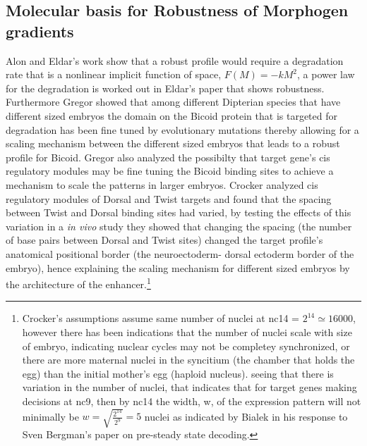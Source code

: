 \subsection{Molecular basis for Robustness of Morphogen gradients}

Alon and Eldar's work show that a robust profile would require a degradation rate that is a nonlinear implicit function of space, $ F(M) = -kM^2$, a power law for the degradation is worked out in Eldar's paper that shows robustness\cite{pmid12239569}.  Furthermore Gregor showed that among different Dipterian species that have different sized embryos the domain on the Bicoid protein that is targeted for degradation has been fine tuned by evolutionary mutations thereby allowing for a scaling mechanism between the different sized embryos that leads to a robust profile for Bicoid.  Gregor also analyzed the possibilty that target gene's cis regulatory modules may be fine tuning the Bicoid binding sites to achieve a mechanism to scale the patterns in larger embryos\cite{pmid16352710}\cite{pmid16352710}.  Crocker analyzed cis regulatory modules of Dorsal and Twist targets and found that the spacing between Twist and Dorsal binding sites had varied, by testing the effects of this variation in a \textit{in vivo} study they showed that changing the spacing (the number of base pairs between Dorsal and Twist sites) changed the target profile's anatomical positional border (the neuroectoderm- dorsal ectoderm border of the embryo), hence explaining the scaling mechanism for different sized embryos by the architecture of the enhancer.\footnote[1]{Crocker's assumptions assume same number of nuclei at nc14 = $2^{14} \simeq 16000$, however there has been indications that the number of nuclei scale with size of embryo, indicating nuclear cycles may not be completey synchronized, or there are more maternal nuclei in the syncitium (the chamber that holds the egg) than the initial mother's egg (haploid nucleus).\cite{kreitman} seeing that there is variation in the number of nuclei, that indicates that for target genes making decisions at nc9, then by nc14 the width, w, of the expression pattern will not minimally be $w = \sqrt{\frac{2^{14}}{2^9}} =5 $ nuclei as indicated by Bialek in his response to Sven Bergman's paper on pre-steady state decoding\cite{Response}\cite{pmid17298180}. } 